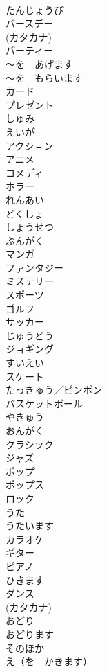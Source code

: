 \documentclass[8pt]{extreport}
\begin{document}
\begin{CJK}{UTF8}{min}
\\	たんじょうび	
\\	バースデー	
\\	(カタカナ)
\\	パーティー	
\\	～を　あげます	
\\	～を　もらいます	
\\	カード	
\\	プレゼント	
\\	しゅみ	
\\	えいが	
\\	アクション	
\\	アニメ	
\\	コメディ	
\\	ホラー	
\\	れんあい	
\\	どくしょ	
\\	しょうせつ	
\\	ぶんがく	
\\	マンガ	
\\	ファンタジー	
\\	ミステリー	
\\	スポーツ	
\\	ゴルフ	
\\	サッカー	
\\	じゅうどう	
\\	ジョギング	
\\	すいえい	
\\	スケート	
\\	たっきゅう／ピンポン	
\\	バスケットボール	
\\	やきゅう	
\\	おんがく	
\\	クラシック	
\\	ジャズ	
\\	ポップ	
\\	ポップス	
\\	ロック	
\\	うた	
\\	うたいます	
\\	カラオケ	
\\	ギター	
\\	ピアノ	
\\	ひきます	
\\	ダンス	
\\	(カタカナ)
\\	おどり	
\\	おどります	
\\	そのほか	
\\	え（を　かきます）	

\end{CJK}
\end{document}

